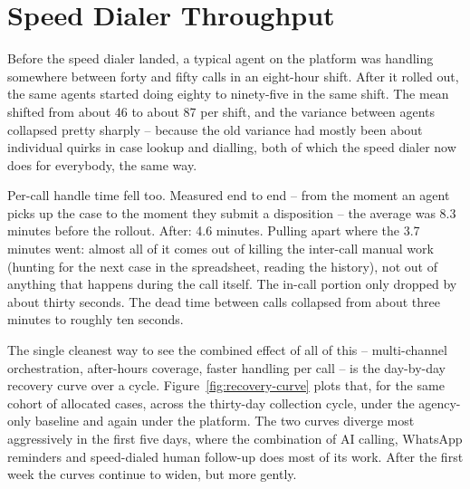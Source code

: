 \section{Speed Dialer Throughput}
Before the speed dialer landed, a typical agent on the platform was handling somewhere between forty and fifty calls in an eight-hour shift. After it rolled out, the same agents started doing eighty to ninety-five in the same shift. The mean shifted from about 46 to about 87 per shift, and the variance between agents collapsed pretty sharply -- because the old variance had mostly been about individual quirks in case lookup and dialling, both of which the speed dialer now does for everybody, the same way.

Per-call handle time fell too. Measured end to end -- from the moment an agent picks up the case to the moment they submit a disposition -- the average was 8.3 minutes before the rollout. After: 4.6 minutes. Pulling apart where the 3.7 minutes went: almost all of it comes out of killing the inter-call manual work (hunting for the next case in the spreadsheet, reading the history), not out of anything that happens during the call itself. The in-call portion only dropped by about thirty seconds. The dead time between calls collapsed from about three minutes to roughly ten seconds.

The single cleanest way to see the combined effect of all of this -- multi-channel orchestration, after-hours coverage, faster handling per call -- is the day-by-day recovery curve over a cycle. Figure~\ref{fig:recovery-curve} plots that, for the same cohort of allocated cases, across the thirty-day collection cycle, under the agency-only baseline and again under the platform. The two curves diverge most aggressively in the first five days, where the combination of AI calling, WhatsApp reminders and speed-dialed human follow-up does most of its work. After the first week the curves continue to widen, but more gently.

